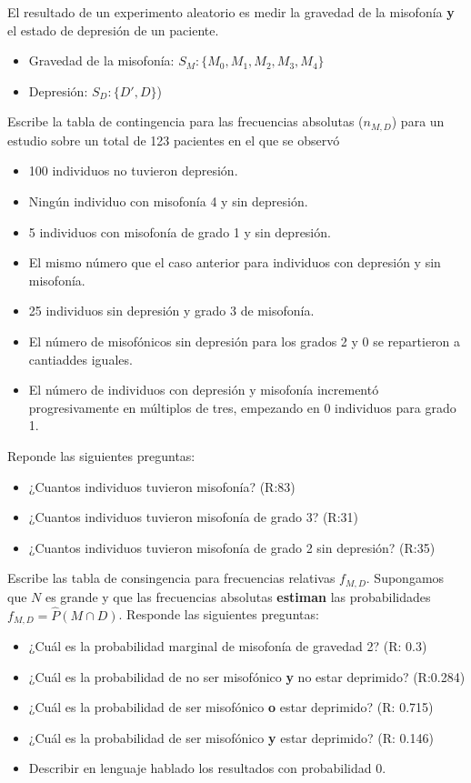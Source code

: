 \documentclass[
]{book}
\providecommand{\tightlist}{%
  \setlength{\itemsep}{0pt}\setlength{\parskip}{0pt}}
\begin{document}
El resultado de un experimento aleatorio es medir la gravedad de la misofonía \textbf{y} el estado de depresión de un paciente.

\begin{itemize}
\tightlist
\item
  Gravedad de la misofonía: \(S_M:\{M_0,M_1,M_2,M_3,M_4\}\)
\item
  Depresión: \(S_D:\{D', D\}\))
\end{itemize}

Escribe la tabla de contingencia para las frecuencias absolutas (\(n_{M,D}\)) para un estudio sobre un total de 123 pacientes en el que se observó

\begin{itemize}
\tightlist
\item
  100 individuos no tuvieron depresión.
\item
  Ningún individuo con misofonía 4 y sin depresión.
\item
  5 individuos con misofonía de grado 1 y sin depresión.
\item
  El mismo número que el caso anterior para individuos con depresión y sin misofonía.
\item
  25 individuos sin depresión y grado 3 de misofonía.
\item
  El número de misofónicos sin depresión para los grados 2 y 0 se repartieron a cantiaddes iguales.
\item
  El número de individuos con depresión y misofonía incrementó progresivamente
  en múltiplos de tres, empezando en 0 individuos para grado 1.
\end{itemize}

Reponde las siguientes preguntas:

\begin{itemize}
\tightlist
\item
  ¿Cuantos individuos tuvieron misofonía? (R:83)
\item
  ¿Cuantos individuos tuvieron misofonía de grado 3? (R:31)
\item
  ¿Cuantos individuos tuvieron misofonía de grado 2 sin depresión? (R:35)
\end{itemize}

Escribe las tabla de consingencia para frecuencias relativas \(f_{M,D}\). Supongamos que \(N\) es grande y que las frecuencias absolutas \textbf{estiman} las probabilidades \(f_{M,D}=\hat{P}(M \cap D)\). Responde las siguientes preguntas:

\begin{itemize}
\tightlist
\item
  ¿Cuál es la probabilidad marginal de misofonía de gravedad 2? (R: 0.3)
\item
  ¿Cuál es la probabilidad de no ser misofónico \textbf{y} no estar deprimido? (R:0.284)
\item
  ¿Cuál es la probabilidad de ser misofónico \textbf{o} estar deprimido? (R: 0.715)
\item
  ¿Cuál es la probabilidad de ser misofónico \textbf{y} estar deprimido? (R: 0.146)
\item
  Describir en lenguaje hablado los resultados con probabilidad 0.
\end{itemize}
\end{document}
